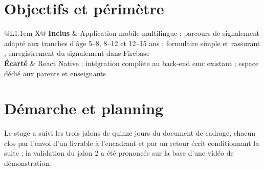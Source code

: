 \documentclass[11pt,a4paper,oneside,openany]{report}
\begin{document}
\section{Objectifs et périmètre}

\begin{table}[htbp]
\centering
\small
\caption{Périmètre du prototype : ce qui est dans le stage et ce qui en est écarté}
\label{tab:perimetre}
\begin{tabularx}{\textwidth}{@{}L{1.1cm} X@{}}
\toprule
\textbf{Inclus} & Application mobile multilingue ; parcours de signalement adapté
aux tranches d'âge 5–8, 8–12 et 12–15 ans ; formulaire simple et rassurant ;
enregistrement du signalement dans Firebase \\
\midrule
\textbf{Écarté} & React Native ; intégration complète au back-end \gls{emc}
existant ; espace dédié aux parents et enseignants \\
\bottomrule
\end{tabularx}
\end{table}

\section{Démarche et planning}

Le stage a suivi les trois jalons de quinze jours du document de cadrage, chacun
clos par l'envoi d'un livrable à l'encadrant et par un retour écrit conditionnant
la suite ; la validation du jalon 2 a été prononcée sur la base d'une vidéo de
démonstration.
\end{document}

